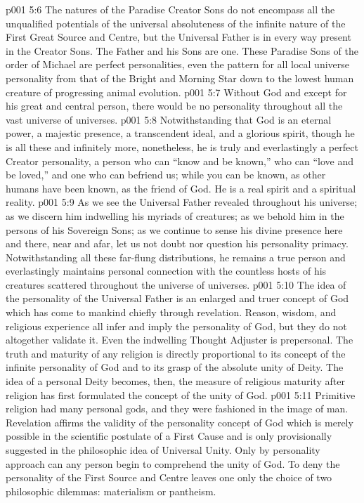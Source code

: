 \vs p001 5:6 The natures of the Paradise Creator Sons do not encompass all the unqualified potentials of the universal absoluteness of the infinite nature of the First Great Source and Centre, but the Universal Father is in every way  present in the Creator Sons. The Father and his Sons are one. These Paradise Sons of the order of Michael are perfect personalities, even the pattern for all local universe personality from that of the Bright and Morning Star down to the lowest human creature of progressing animal evolution.
\vs p001 5:7 \pc Without God and except for his great and central person, there would be no personality throughout all the vast universe of universes. 
\vs p001 5:8 \pc Notwithstanding that God is an eternal power, a majestic presence, a transcendent ideal, and a glorious spirit, though he is all these and infinitely more, nonetheless, he is truly and everlastingly a perfect Creator personality, a person who can “know and be known,” who can “love and be loved,” and one who can befriend us; while you can be known, as other humans have been known, as the friend of God. He is a real spirit and a spiritual reality.
\vs p001 5:9 As we see the Universal Father revealed throughout his universe; as we discern him indwelling his myriads of creatures; as we behold him in the persons of his Sovereign Sons; as we continue to sense his divine presence here and there, near and afar, let us not doubt nor question his personality primacy. Notwithstanding all these far\hyp{}flung distributions, he remains a true person and everlastingly maintains personal connection with the countless hosts of his creatures scattered throughout the universe of universes.
\vs p001 5:10 \pc The idea of the personality of the Universal Father is an enlarged and truer concept of God which has come to mankind chiefly through revelation. Reason, wisdom, and religious experience all infer and imply the personality of God, but they do not altogether validate it. Even the indwelling Thought Adjuster is prepersonal. The truth and maturity of any religion is directly proportional to its concept of the infinite personality of God and to its grasp of the absolute unity of Deity. The idea of a personal Deity becomes, then, the measure of religious maturity after religion has first formulated the concept of the unity of God.
\vs p001 5:11 Primitive religion had many personal gods, and they were fashioned in the image of man. Revelation affirms the validity of the personality concept of God which is merely possible in the scientific postulate of a First Cause and is only provisionally suggested in the philosophic idea of Universal Unity. Only by personality approach can any person begin to comprehend the unity of God. To deny the personality of the First Source and Centre leaves one only the choice of two philosophic dilemmas: materialism or pantheism.
